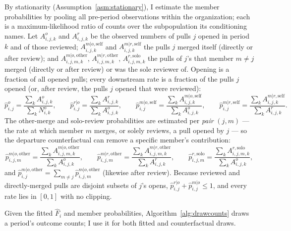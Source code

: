 \documentclass[12pt,notitlepage]{article}
\begin{document}
By stationarity (Assumption~\ref{asm:stationary}), I estimate the member probabilities by pooling all pre-period observations within the organization; each is a maximum-likelihood ratio of counts over the subpopulation its conditioning names.
Let $A_{i,j,k}^o$ and $A_{i,j,k}^{r}$ be the observed numbers of pulls $j$ opened in period $k$ and of those reviewed; $A_{i,j,k}^{m|o,\mathrm{self}}$ and $A_{i,j,k}^{m|r,\mathrm{self}}$ the pulls $j$ merged itself (directly or after review); and $A_{i,j,m,k}^{m|o,\mathrm{other}}$, $A_{i,j,m,k}^{m|r,\mathrm{other}}$, $A_{i,j,m,k}^{r,\mathrm{solo}}$ the pulls of $j$'s that member $m\neq j$ merged (directly or after review) or was the sole reviewer of.
Opening is a fraction of all opened pulls; every downstream rate is a fraction of the pulls $j$ opened (or, after review, the pulls $j$ opened that were reviewed):
\[ \hat{p}_{i,j}^o = \frac{\sum_k A_{i,j,k}^o}{\sum_k N_{i,k}^o}, \qquad \hat{p}_{i,j}^{r|o} = \frac{\sum_k A_{i,j,k}^{r}}{\sum_k A_{i,j,k}^o}, \qquad \hat{p}_{i,j}^{m|o,\mathrm{self}} = \frac{\sum_k A_{i,j,k}^{m|o,\mathrm{self}}}{\sum_k A_{i,j,k}^o}, \qquad \hat{p}_{i,j}^{m|r,\mathrm{self}} = \frac{\sum_k A_{i,j,k}^{m|r,\mathrm{self}}}{\sum_k A_{i,j,k}^{r}}. \]
The other-merge and solo-review probabilities are estimated per \emph{pair} $(j,m)$ --- the rate at which member $m$ merges, or solely reviews, a pull opened by $j$ --- so the departure counterfactual can remove a specific member's contribution:
\[ \hat{p}_{i,j,m}^{m|o,\mathrm{other}} = \frac{\sum_k A_{i,j,m,k}^{m|o,\mathrm{other}}}{\sum_k A_{i,j,k}^o}, \qquad \hat{p}_{i,j,m}^{m|r,\mathrm{other}} = \frac{\sum_k A_{i,j,m,k}^{m|r,\mathrm{other}}}{\sum_k A_{i,j,k}^{r}}, \qquad \hat{p}_{i,j,m}^{r,\mathrm{solo}} = \frac{\sum_k A_{i,j,m,k}^{r,\mathrm{solo}}}{\sum_k A_{i,j,k}^o}, \]
and $\hat{p}_{i,j}^{m|o,\mathrm{other}} = \sum_{m\neq j}\hat{p}_{i,j,m}^{m|o,\mathrm{other}}$ (likewise after review).
Because reviewed and directly-merged pulls are disjoint subsets of $j$'s opens, $\hat p_{i,j}^{r|o} + \hat p_{i,j}^{m|o}\le 1$, and every rate lies in $[0,1]$ with no clipping.

Given the fitted $\hat F_i$ and member probabilities, Algorithm~\ref{alg:drawcounts} draws a period's outcome counts; I use it for both fitted and counterfactual draws.
\end{document}
